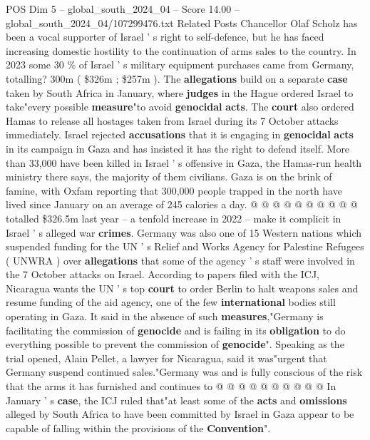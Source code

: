 \begin{textsample}{POS Dim 5 – global\_south\_2024\_04 – Score 14.00 – global\_south\_2024\_04/107299476.txt}  \label{ex:f5_pos_271}
Related Posts Chancellor Olaf Scholz has been a vocal supporter of Israel ' s right to self-defence, but he has faced increasing domestic hostility to the continuation of arms sales to the country.
In 2023 some 30 \% of Israel ' s military equipment purchases came from Germany, totalling? 300m ( \$326m ; \$257m ).
The \textbf{allegations} build on a separate \textbf{case} taken by South Africa in January, where \textbf{judges} in the Hague ordered Israel to take"every possible \textbf{measure}"to avoid \textbf{genocidal} \textbf{acts}.
The \textbf{court} also ordered Hamas to release all hostages taken from Israel during its 7 October attacks immediately.
Israel rejected \textbf{accusations} that it is engaging in \textbf{genocidal} \textbf{acts} in its campaign in Gaza and has insisted it has the right to defend itself.
More than 33,000 have been killed in Israel ' s offensive in Gaza, the Hamas-run health ministry there says, the majority of them civilians.
Gaza is on the brink of famine, with Oxfam reporting that 300,000 people trapped in the north have lived since January on an average of 245 calories a day. @ @ @ @ @ @ @ @ @ @ totalled \$326.5m last year -- a tenfold increase in 2022 -- make it complicit in Israel ' s alleged war \textbf{crimes}.
Germany was also one of 15 Western nations which suspended funding for the UN ' s Relief and Works Agency for Palestine Refugees ( UNWRA ) over \textbf{allegations} that some of the agency ' s staff were involved in the 7 October attacks on Israel.
According to papers filed with the ICJ, Nicaragua wants the UN ' s top \textbf{court} to order Berlin to halt weapons sales and resume funding of the aid agency, one of the few \textbf{international} bodies still operating in Gaza.
It said in the absence of such \textbf{measures},"Germany is facilitating the commission of \textbf{genocide} and is failing in its \textbf{obligation} to do everything possible to prevent the commission of \textbf{genocide}".
Speaking as the trial opened, Alain Pellet, a lawyer for Nicaragua, said it was"urgent that Germany suspend continued sales."Germany was and is fully conscious of the risk that the arms it has furnished and continues to @ @ @ @ @ @ @ @ @ @ In January ' s \textbf{case}, the ICJ ruled that"at least some of the \textbf{acts} and \textbf{omissions} alleged by South Africa to have been committed by Israel in Gaza appear to be capable of falling within the provisions of the \textbf{Convention}".

\end{textsample}
